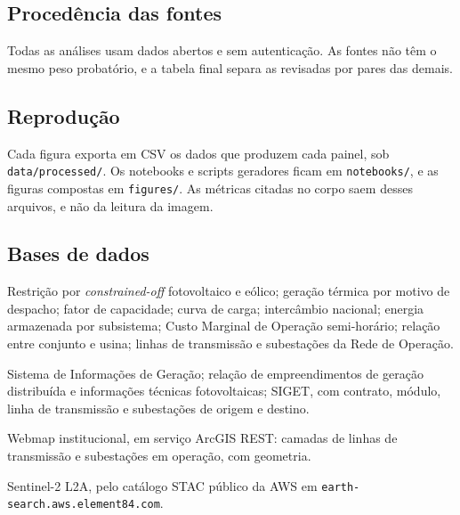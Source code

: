 \clearpage
\begin{landscape}

\chapter{Procedência das fontes}
\label{ap:procedencia}

\begin{promancha}
Todas as análises usam dados abertos e sem autenticação. As fontes não têm o
mesmo peso probatório, e a tabela final separa as revisadas por pares das
demais.
\end{promancha}

\section*{Reprodução}

\begin{promancha}
Cada figura exporta em CSV os dados que produzem cada painel, sob
\texttt{data/processed/}. Os notebooks e scripts geradores ficam em
\texttt{notebooks/}, e as figuras compostas em \texttt{figures/}. As métricas
citadas no corpo saem desses arquivos, e não da leitura da imagem.
\end{promancha}

\section*{Bases de dados}

\begin{promancha}
 Restrição por \textit{constrained-off}
fotovoltaico e eólico; geração térmica por motivo de despacho; fator de
capacidade; curva de carga; intercâmbio nacional; energia armazenada por
subsistema; Custo Marginal de Operação semi-horário; relação entre conjunto e
usina; linhas de transmissão e subestações da Rede de Operação.

 Sistema de Informações de Geração; relação de empreendimentos de
geração distribuída e informações técnicas fotovoltaicas; SIGET, com contrato,
módulo, linha de transmissão e subestações de origem e destino.

 Webmap institucional, em serviço ArcGIS REST: camadas de linhas de
transmissão e subestações em operação, com geometria.

 Sentinel-2 L2A, pelo catálogo STAC público da AWS em
\texttt{earth-\allowbreak search.\allowbreak aws.\allowbreak element84.\allowbreak com}.


\end{promancha}
\end{landscape}
